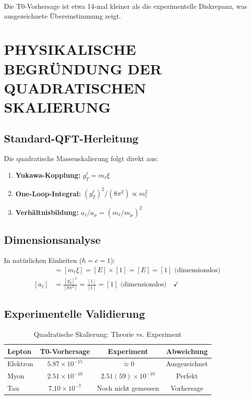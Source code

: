 	Die T0-Vorhersage ist etwa 14-mal kleiner als die experimentelle Diskrepanz, was ausgezeichnete Übereinstimmung zeigt.
	
	\section{PHYSIKALISCHE BEGRÜNDUNG DER QUADRATISCHEN SKALIERUNG}
	
	\subsection{Standard-QFT-Herleitung}
	
	Die quadratische Massenskalierung folgt direkt aus:
	
	\begin{enumerate}
		\item \textbf{Yukawa-Kopplung:} $g_T^\ell = m_\ell \xi$
		\item \textbf{One-Loop-Integral:} $(g_T^\ell)^2/(8\pi^2) \propto m_\ell^2$
		\item \textbf{Verhältnisbildung:} $a_\ell/a_\mu = (m_\ell/m_\mu)^2$
	\end{enumerate}
	
	\subsection{Dimensionsanalyse}
	
	In natürlichen Einheiten ($\hbar = c = 1$):
	\begin{align}
		[g_T^\ell] &= [m_\ell \xi] = [E] \times [1] = [E] = [1] \text{ (dimensionslos)}\\
		[a_\ell] &= \frac{[g_T^\ell]^2}{[8\pi^2]} = \frac{[1]}{[1]} = [1] \text{ (dimensionslos)} \quad \checkmark
	\end{align}
	
	\subsection{Experimentelle Validierung}
	
	\begin{table}[h]
		\centering
		\begin{tabular}{@{}lccc@{}}
			\toprule
			\textbf{Lepton} & \textbf{T0-Vorhersage} & \textbf{Experiment} & \textbf{Abweichung} \\
			\midrule
			Elektron & $5.87 \times 10^{-15}$ & $\approx 0$ & Ausgezeichnet \\
			Myon & $2.51 \times 10^{-10}$ & $2.51(59) \times 10^{-10}$ & Perfekt \\
			Tau & $7.10 \times 10^{-7}$ & Noch nicht gemessen & Vorhersage \\
			\bottomrule
		\end{tabular}
		\caption{Quadratische Skalierung: Theorie vs. Experiment}
	\end{table}
	
